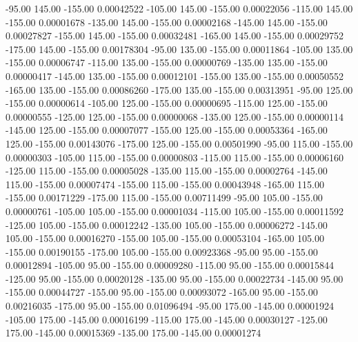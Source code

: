     -95.00    145.00   -155.00     0.00042522
   -105.00    145.00   -155.00     0.00022056
   -115.00    145.00   -155.00     0.00001678
   -135.00    145.00   -155.00     0.00002168
   -145.00    145.00   -155.00     0.00027827
   -155.00    145.00   -155.00     0.00032481
   -165.00    145.00   -155.00     0.00029752
   -175.00    145.00   -155.00     0.00178304
    -95.00    135.00   -155.00     0.00011864
   -105.00    135.00   -155.00     0.00006747
   -115.00    135.00   -155.00     0.00000769
   -135.00    135.00   -155.00     0.00000417
   -145.00    135.00   -155.00     0.00012101
   -155.00    135.00   -155.00     0.00050552
   -165.00    135.00   -155.00     0.00086260
   -175.00    135.00   -155.00     0.00313951
    -95.00    125.00   -155.00     0.00000614
   -105.00    125.00   -155.00     0.00000695
   -115.00    125.00   -155.00     0.00000555
   -125.00    125.00   -155.00     0.00000068
   -135.00    125.00   -155.00     0.00000114
   -145.00    125.00   -155.00     0.00007077
   -155.00    125.00   -155.00     0.00053364
   -165.00    125.00   -155.00     0.00143076
   -175.00    125.00   -155.00     0.00501990
    -95.00    115.00   -155.00     0.00000303
   -105.00    115.00   -155.00     0.00000803
   -115.00    115.00   -155.00     0.00006160
   -125.00    115.00   -155.00     0.00005028
   -135.00    115.00   -155.00     0.00002764
   -145.00    115.00   -155.00     0.00007474
   -155.00    115.00   -155.00     0.00043948
   -165.00    115.00   -155.00     0.00171229
   -175.00    115.00   -155.00     0.00711499
    -95.00    105.00   -155.00     0.00000761
   -105.00    105.00   -155.00     0.00001034
   -115.00    105.00   -155.00     0.00011592
   -125.00    105.00   -155.00     0.00012242
   -135.00    105.00   -155.00     0.00006272
   -145.00    105.00   -155.00     0.00016270
   -155.00    105.00   -155.00     0.00053104
   -165.00    105.00   -155.00     0.00190155
   -175.00    105.00   -155.00     0.00923368
    -95.00     95.00   -155.00     0.00012894
   -105.00     95.00   -155.00     0.00009280
   -115.00     95.00   -155.00     0.00015844
   -125.00     95.00   -155.00     0.00020128
   -135.00     95.00   -155.00     0.00022734
   -145.00     95.00   -155.00     0.00044727
   -155.00     95.00   -155.00     0.00093072
   -165.00     95.00   -155.00     0.00216035
   -175.00     95.00   -155.00     0.01096494
    -95.00    175.00   -145.00     0.00001924
   -105.00    175.00   -145.00     0.00016199
   -115.00    175.00   -145.00     0.00030127
   -125.00    175.00   -145.00     0.00015369
   -135.00    175.00   -145.00     0.00001274
